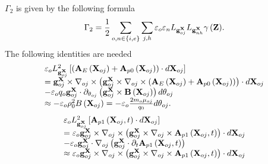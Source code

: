 \documentclass[12pt]{iopart}
\begin{document}
$\Gamma_2$ is given by the following formula
\begin{equation}\label{af31}
{\Gamma _2} = \frac{1}{2}\sum\limits_{o,n \in \{ i,e\} } {\sum\limits_{j,h} {{\varepsilon _o}{\varepsilon _n}{L_{{\bf{g}}_{oj}^{\bf{X}}}}{L_{{\bf{g}}_{nh}^{\bf{X}}}}\gamma \left( {\bf{Z}} \right)}}.
\end{equation}
The following identities are needed
\begin{equation}\label{af32}
\begin{array}{l}
{\varepsilon _o}L_{{\bf{g}}_{oj}^{\bf{X}}}^2\left[ {\left( {{{\bf{A}}_E}\left( {{{\bf{X}}_{oj}}} \right) + {{\bf{A}}_{p0}}\left( {{{\bf{X}}_{oj}}} \right)} \right)\cdot d{{\bf{X}}_{oj}}} \right]\\
 = {\bf{g}}_{oj}^{\bf{X}} \times {\nabla _{oj}} \times \left( {{\bf{g}}_{oj}^{\bf{X}} \times {\nabla _{oj}} \times \left( {{{\bf{A}}_E}\left( {{{\bf{X}}_{oj}}} \right) + {{\bf{A}}_{p0}}\left( {{{\bf{X}}_{oj}}} \right)} \right)} \right)\cdot d{{\bf{X}}_{oj}}\\
 - {\varepsilon _o}{q_o}{\bf{g}}_{oj}^{\bf{X}}\cdot{\partial _{{\theta _{oj}}}}\left( {{\bf{g}}_{oj}^{\bf{X}} \times {\bf{B}}\left( {{{\bf{X}}_{oj}}} \right)} \right)d{\theta _{oj}}\\
 \approx  - {\varepsilon _o}\rho _0^2B\left( {{{\bf{X}}_{oj}}} \right) =  - {\varepsilon _o}\frac{{2{m_o}{\mu _{oj}}}}{{{q_0}}}d{\theta _{oj}}.
\end{array}
\end{equation}
\begin{equation}\label{af33}
\begin{array}{l}
{\varepsilon _o}L_{{\bf{g}}_{oj}^{\bf{X}}}^2\left[ {{{\bf{A}}_{p1}}\left( {{{\bf{X}}_{oj}},t} \right)\cdot d{{\bf{X}}_{oj}}} \right]\\
 = {\varepsilon _o}{\bf{g}}_{oj}^{\bf{X}} \times {\nabla _{oj}} \times \left( {{\bf{g}}_{oj}^{\bf{X}} \times {\nabla _{oj}} \times {{\bf{A}}_{p1}}\left( {{{\bf{X}}_{oj}},t} \right)} \right)\cdot d{{\bf{X}}_{oj}}\\
 - {\varepsilon _o}{\bf{g}}_{oj}^{\bf{X}}\cdot{\nabla _{oj}}\left( {{\bf{g}}_{oj}^{\bf{X}}\cdot{\partial _t}{{\bf{A}}_{p1}}\left( {{{\bf{X}}_{oj}},t} \right)} \right)\\
 \approx {\varepsilon _o}{\bf{g}}_{oj}^{\bf{X}} \times {\nabla _{oj}} \times \left( {{\bf{g}}_{oj}^{\bf{X}} \times {\nabla _{oj}} \times {{\bf{A}}_{p1}}\left( {{{\bf{X}}_{oj}},t} \right)} \right)\cdot d{{\bf{X}}_{oj}}
\end{array}
\end{equation}
\end{document}
